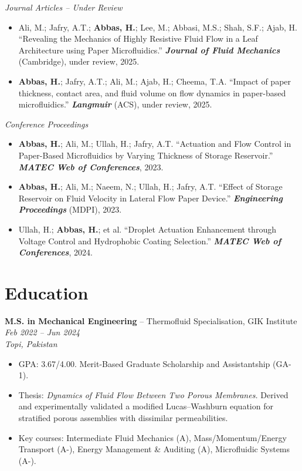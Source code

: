 \documentclass[11pt,a4paper]{article}
\begin{document}
\textit{Journal Articles -- Under Review}
\begin{itemize}
  \item Ali, M.; Jafry, A.T.; \textbf{Abbas, H.}; Lee, M.; Abbasi, M.S.; Shah,
        S.F.; Ajab, H. ``Revealing the Mechanics of Highly Resistive Fluid Flow in
        a Leaf Architecture using Paper Microfluidics.''
        \textbf{\textit{Journal of Fluid Mechanics}} (Cambridge), under review,
        2025.
  \item \textbf{Abbas, H.}; Jafry, A.T.; Ali, M.; Ajab, H.; Cheema, T.A.
        ``Impact of paper thickness, contact area, and fluid volume on flow
        dynamics in paper-based microfluidics.''
        \textbf{\textit{Langmuir}} (ACS), under review, 2025.
\end{itemize}

\vspace{4pt}
\textit{Conference Proceedings}
\begin{itemize}
  \item \textbf{Abbas, H.}; Ali, M.; Ullah, H.; Jafry, A.T. ``Actuation and Flow
        Control in Paper-Based Microfluidics by Varying Thickness of Storage
        Reservoir.'' \textbf{\textit{MATEC Web of Conferences}}, 2023.
  \item \textbf{Abbas, H.}; Ali, M.; Naeem, N.; Ullah, H.; Jafry, A.T. ``Effect
        of Storage Reservoir on Fluid Velocity in Lateral Flow Paper Device.''
        \textbf{\textit{Engineering Proceedings}} (MDPI), 2023.
  \item Ullah, H.; \textbf{Abbas, H.}; et al. ``Droplet Actuation Enhancement
        through Voltage Control and Hydrophobic Coating Selection.''
        \textbf{\textit{MATEC Web of Conferences}}, 2024.
\end{itemize}

\section{Education}

\textbf{M.S. in Mechanical Engineering} -- Thermofluid Specialisation, GIK
Institute \hfill \textit{Feb 2022 -- Jun 2024}\\
\textit{Topi, Pakistan}
\begin{itemize}
  \item GPA: 3.67/4.00. Merit-Based Graduate Scholarship and Assistantship (GA-1).
  \item Thesis: \textit{Dynamics of Fluid Flow Between Two Porous Membranes.}
        Derived and experimentally validated a modified Lucas--Washburn equation
        for stratified porous assemblies with dissimilar permeabilities.
  \item Key courses: Intermediate Fluid Mechanics (A), Mass/Momentum/Energy
        Transport (A-), Energy Management \& Auditing (A), Microfluidic Systems
        (A-).
\end{itemize}
\end{document}
